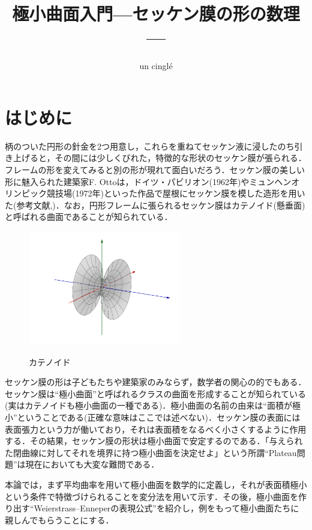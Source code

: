 \documentclass[a4j]{ltjsarticle}
\numberwithin{equation}{section}
\theoremstyle{definition}
\begin{document}
\title{極小曲面入門---セッケン膜の形の数理---}
\author{un cinglé}
\date{}
\maketitle
\section{はじめに}
柄のついた円形の針金を2つ用意し，これらを重ねてセッケン液に浸したのち引き上げると，その間には少しくびれた，特徴的な形状のセッケン膜が張られる．フレームの形を変えてみると別の形が現れて面白いだろう．セッケン膜の美しい形に魅入られた建築家F. Ottoは，ドイツ・パビリオン(1962年)やミュンヘンオリンピック競技場(1972年)といった作品で屋根にセッケン膜を模した造形を用いた(参考文献\cite{HT},\cite{FB})．なお，円形フレームに張られるセッケン膜はカテノイド(懸垂面)と呼ばれる曲面であることが知られている．

\begin{figure}[htbp]
    \begin{center}
        \includegraphics[height=50mm]{catenoid.png}
        \label{pic:catenoid}
        \caption{カテノイド}
    \end{center}
\end{figure}

セッケン膜の形は子どもたちや建築家のみならず，数学者の関心の的でもある．セッケン膜は``極小曲面''と呼ばれるクラスの曲面を形成することが知られている(実はカテノイドも極小曲面の一種である)．極小曲面の名前の由来は``面積が極小''ということである(正確な意味はここでは述べない)．セッケン膜の表面には表面張力という力が働いており，それは表面積をなるべく小さくするように作用する．その結果，セッケン膜の形状は極小曲面で安定するのである．「与えられた閉曲線に対してそれを境界に持つ極小曲面を決定せよ」という所謂``Plateau問題''は現在においても大変な難問である．

本論では，まず平均曲率を用いて極小曲面を数学的に定義し，それが表面積極小という条件で特徴づけられることを変分法を用いて示す．その後，極小曲面を作り出す``Weierstrass--Enneperの表現公式''を紹介し，例をもって極小曲面たちに親しんでもらうことにする．
\end{document}
